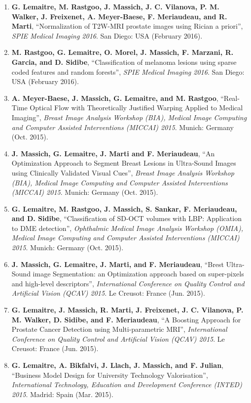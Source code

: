 {\begin{enumerate}
\item \textbf{G. Lemaitre, M. Rastgoo, J. Massich, J. C. Vilanova, P. M. Walker, J. Freixenet, A. Meyer-Baese, F. Meriaudeau, and R. Marti}, ``Normalization of T2W-MRI prostate images using Rician a priori'', \textit{SPIE Medical Imaging 2016}. San Diego: USA (February 2016).
\item \textbf{M. Rastgoo, G. Lemaitre, O. Morel, J. Massich, F. Marzani, R. Garcia, and D. Sidibe}, ``Classification of melanoma lesions using sparse coded features and random forests'', \textit{SPIE Medical Imaging 2016}. San Diego: USA (February 2016).
\item \textbf{A. Meyer-Baese, J. Massich, G. Lemaitre, and M. Rastgoo}, ``Real-Time Optical Flow with Theoretically Justified Warping Applied to Medical Imaging'', \textit{Breast Image Analysis Workshop (BIA), Medical Image Computing and Computer Assisted Interventions (MICCAI) 2015}. Munich: Germany (Oct. 2015).
\item \textbf{J. Massich, G. Lemaitre, J. Marti and F. Meriaudeau}, ``An Optimization Approach to Segment Breast Lesions in Ultra-Sound Images using Clinically Validated Visual Cues'', \textit{Breast Image Analysis Workshop (BIA), Medical Image Computing and Computer Assisted Interventions (MICCAI) 2015}. Munich: Germany (Oct. 2015).
\item \textbf{G. Lemaitre, M. Rastgoo, J. Massich, S. Sankar, F. Meriaudeau, and D. Sidibe}, ``Classification of SD-OCT volumes with LBP: Application to DME detection'', \textit{Ophthalmic Medical Image Analysis Workshop (OMIA), Medical Image Computing and Computer Assisted Interventions (MICCAI) 2015}. Munich: Germany (Oct. 2015).
\item \textbf{J. Massich, G. Lemaitre, J. Marti, and F. Meriaudeau}, ``Brest Ultra-Sound image Segmentation: an Optimization approach based on super-pixels and high-level descriptors'', \textit{International Conference on Quality Control and Artificial Vision (QCAV) 2015}. Le Creusot: France (Jun. 2015).
\item \textbf{G. Lemaitre, J. Massich, R. Marti, J. Freixenet, J. C. Vilanova, P. M. Walker, D. Sidibe, and F. Meriaudeau}, ``A Boosting Approach for Prostate Cancer Detection using Multi-parametric MRI'', \textit{International Conference on Quality Control and Artificial Vision (QCAV) 2015}. Le Creusot: France (Jun. 2015).
\item \textbf{G. Lemaitre, A. Bikfalvi, J. Llach, J. Massich, and F. Julian}, ``Business Model Design for University Technology Valorisation'', \textit{International Technology, Education and Development Conference (INTED) 2015}. Madrid: Spain (Mar. 2015).

\end{enumerate}}
